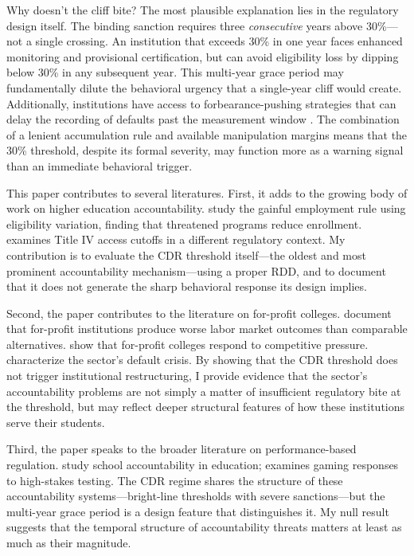 \documentclass[12pt]{article}
\begin{document}
Why doesn't the cliff bite? The most plausible explanation lies in the regulatory design itself. The binding sanction requires three \textit{consecutive} years above 30\%---not a single crossing. An institution that exceeds 30\% in one year faces enhanced monitoring and provisional certification, but can avoid eligibility loss by dipping below 30\% in any subsequent year. This multi-year grace period may fundamentally dilute the behavioral urgency that a single-year cliff would create. Additionally, institutions have access to forbearance-pushing strategies that can delay the recording of defaults past the measurement window \citep{itzkowitz2018}. The combination of a lenient accumulation rule and available manipulation margins means that the 30\% threshold, despite its formal severity, may function more as a warning signal than an immediate behavioral trigger.

This paper contributes to several literatures. First, it adds to the growing body of work on higher education accountability. \citet{cellini2019} study the gainful employment rule using eligibility variation, finding that threatened programs reduce enrollment. \citet{darolia2013} examines Title IV access cutoffs in a different regulatory context. My contribution is to evaluate the CDR threshold itself---the oldest and most prominent accountability mechanism---using a proper RDD, and to document that it does not generate the sharp behavioral response its design implies.

Second, the paper contributes to the literature on for-profit colleges. \citet{deming2012} document that for-profit institutions produce worse labor market outcomes than comparable alternatives. \citet{cellini2020} show that for-profit colleges respond to competitive pressure. \citet{looney2015} characterize the sector's default crisis. By showing that the CDR threshold does not trigger institutional restructuring, I provide evidence that the sector's accountability problems are not simply a matter of insufficient regulatory bite at the threshold, but may reflect deeper structural features of how these institutions serve their students.

Third, the paper speaks to the broader literature on performance-based regulation. \citet{figlio2006} study school accountability in education; \citet{jacob2005} examines gaming responses to high-stakes testing. The CDR regime shares the structure of these accountability systems---bright-line thresholds with severe sanctions---but the multi-year grace period is a design feature that distinguishes it. My null result suggests that the temporal structure of accountability threats matters at least as much as their magnitude.
\end{document}

